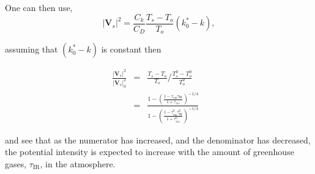 One can then use,
\begin{equation}
\left|\mathbf{V}_{s}\right|^{2}=\frac{C_{k}}{C_{D}}
\frac{T_{s}-T_{o}}{T_{o}}\left(k_{0}^{*}-k\right),
\tag{PI}
\end{equation}

assuming that $\left(k_{0}^{*}-k\right)$ is constant then

\begin{align}
\frac{\left|\mathbf{V}_{s}\right|^{2}}{\left|\mathbf{V}_{s}\right|_{0}^{2}}
&=& \frac{T_{s}-T_{o}}{T_{o}}/\frac{T^{0}_{s}-T^{0}_{o}}{T^{0}_{o}}\\
&=& \frac{1- \left(\frac{1-\tau_{\mathrm{vis}}\tau_{\mathrm{IR}}}{1+\tau_{vis}}\right)^{-1/4}}
          {1- \left(\frac{1-\tau^{0}_{\mathrm{vis}}\tau^{0}_{\mathrm{IR}}}{1+\tau^{0}_{vis}}\right)^{-1/4}} &
\end{align}



 and see that as the numerator has increased, and the
denominator has decreased, the potential intensity is expected to increase with the
amount of greenhouse gases, $\tau_{\mathrm{IR}}$, in the atmosphere.
